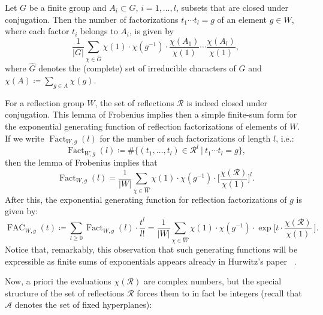 \documentclass[ALCO, Unicode]{cedram}
\newcommand{\op}[1]{\operatorname{#1}}
\newcommand{\op}[1]{\operatorname{#1}}
\begin{document}
\begin{theo}\label{Thm: Frobenius lemma}
Let $G$ be a finite group and $A_i\subset G$, $i=1,\ldots, l$, subsets that are closed under conjugation. Then the number of factorizations $t_1\cdots t_l=g$ of an element $g\in W$, where each factor $t_i$ belongs to $A_i$, is given by$$
\dfrac{1}{|G|}\sum_{\chi\in \widehat{G}}\chi(1)\cdot\chi(g^{-1})\cdot\dfrac{\chi(A_1)}{\chi(1)}\cdots\dfrac{\chi(A_l)}{\chi(1)},$$ where $\widehat{G}$ denotes the (complete) set of irreducible characters of $G$ and $\chi(A)\coloneqq \sum_{g\in A}\chi(g)$.  
\end{theo}

For a reflection group $W$, the set of reflections $\mathcal{R}$ is indeed closed under conjugation. This lemma of Frobenius implies then a simple finite-sum form for the exponential generating function of reflection factorizations of elements of $W$. If we write $\op{Fact}_{W,g}(l)$ for the number of such factorizations of length $l$, i.e.:$$
\op{Fact}_{W,g}(l)\coloneqq \#\{(t_1,\ldots,t_l)\in\mathcal{R}^l\ |\ t_1\cdots t_l=g\},$$ then the lemma of Frobenius implies that $$
\op{Fact}_{W,g}(l)=\dfrac{1}{|W|}\sum_{\chi\in\widehat{W}}\chi(1)\cdot\chi(g^{-1})\cdot \Big[\frac{\chi(\mathcal{R})}{\chi(1)}\Big]^l.$$ After this, the exponential generating function for reflection factorizations of $g$ is given by:\begin{equation}
\op{FAC}_{W,g}(t)\coloneqq \sum_{l\geq 0}\op{Fact}_{W,g}(l)\cdot\frac{t^l}{l!}=\dfrac{1}{|W|}\sum_{\chi\in\widehat{W}}\chi(1)\cdot\chi(g^{-1})\cdot \op{exp}\Big[t\cdot\frac{\chi(\mathcal{R})}{\chi(1)}\ \Big].\label{Eq: Frob formula no Cox} \end{equation}Notice that, remarkably, this observation that such generating functions will be expressible as finite sums of exponentials appears already in Hurwitz's paper ~\cite[\S\,3:(15)]{hurwitz-1901-paper}.

Now, a priori the evaluations $\chi(\mathcal{R})$ are complex numbers, but the special structure of the set of reflections $\mathcal{R}$ forces them to in fact be integers (recall that $\mathcal{A}$ denotes the set of fixed  hyperplanes):
\end{document}
